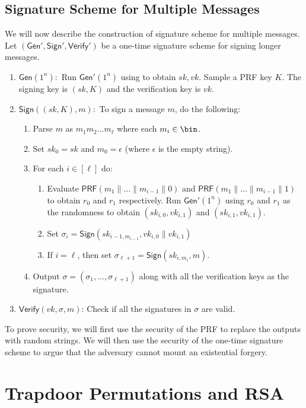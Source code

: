\documentclass[12pt]{tufte-book}
\newcommand{\Gen}{\mathsf{Gen}}
\newcommand{\Sign}{\mathsf{Sign}}
\newcommand{\Verify}{\mathsf{Verify}}
\newcommand{\PRF}{\mathsf{PRF}}
\begin{document}
\subsection{Signature Scheme for Multiple Messages}
We will now describe the construction of signature scheme for multiple messages. Let $(\Gen',\Sign',\Verify')$ be a one-time signature scheme for signing longer messages. 
\begin{enumerate}
    \item $\Gen(1^n):$ Run $\Gen'(1^n)$ using to obtain $sk,vk$. Sample a PRF key $K$. The signing key is $(sk,K)$ and the verification key is $vk$.
    \item $\Sign((sk,K),m):$ To sign a message $m$, do the following:
    \begin{enumerate}
        \item Parse $m$ as $m_1m_2\ldots m_{\ell}$ where each $m_i \in \bin$.
        \item Set $sk_0 = sk$ and $m_0 = \epsilon$ (where $\epsilon$ is the empty string).
        \item For each $i \in [\ell]$ do:
        \begin{enumerate}
            \item Evaluate $\PRF(m_1\|\ldots\|m_{i-1}\|0)$ and $\PRF(m_1\|\ldots\|m_{i-1}\|1)$ to obtain $r_0$ and $r_1$ respectively. Run $\Gen'(1^n)$ using $r_0$ and $r_1$ as the randomness to obtain $(sk_{i,0},vk_{i,1})$ and $(sk_{i,1},vk_{i,1})$.
            \item Set $\sigma_i = \Sign(sk_{i-1,m_{i-1}},vk_{i,0}\|vk_{i,1})$
            \item If $i = \ell$, then set $\sigma_{\ell+1} = \Sign(sk_{i,m_i},m)$.

        \end{enumerate}
        \item Output $\sigma = (\sigma_1,\ldots,\sigma_{\ell+1})$ along with all the verification keys as the signature.
    \end{enumerate}
    \item $\Verify(vk,\sigma,m)$: Check if all the signatures in $\sigma$ are valid.
\end{enumerate}

To prove security, we will first use the security of the PRF to replace the outputs with random strings. We will then use the security of the one-time signature scheme to argue that the adversary cannot mount an existential forgery.

\section{Trapdoor Permutations and RSA} 
\end{document}
